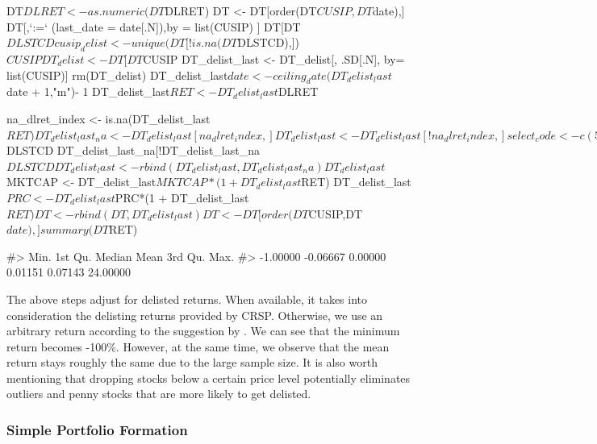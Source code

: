 \begin{Schunk}
\begin{Sinput}
DT$DLRET <- as.numeric(DT$DLRET)
DT <- DT[order(DT$CUSIP,DT$date),]
DT[,`:=` (last_date = date[.N]),by = list(CUSIP) ]
DT[DT$DLSTCD %
cusip_delist <- unique(DT[!is.na(DT$DLSTCD),])$CUSIP

DT_delist <- DT[DT$CUSIP %
DT_delist_last <- DT_delist[, .SD[.N],  by= list(CUSIP)]
rm(DT_delist)
DT_delist_last$date <- ceiling_date(DT_delist_last$date + 1,"m")- 1
DT_delist_last$RET <- DT_delist_last$DLRET

na_dlret_index <- is.na(DT_delist_last$RET)
DT_delist_last_na <- DT_delist_last[na_dlret_index,]
DT_delist_last <-DT_delist_last[!na_dlret_index,]

select_code <- c(500,520:551,573,574,580,584)
DT_delist_last_na[DT_delist_last_na$DLSTCD %
DT_delist_last_na[!DT_delist_last_na$DLSTCD %

DT_delist_last <- rbind(DT_delist_last,DT_delist_last_na)
DT_delist_last$MKTCAP <- DT_delist_last$MKTCAP*(1 + DT_delist_last$RET)
DT_delist_last$PRC <- DT_delist_last$PRC*(1 + DT_delist_last$RET)

DT <- rbind(DT,DT_delist_last)
DT <- DT[order(DT$CUSIP,DT$date),]
summary(DT$RET) %
\end{Sinput}
\begin{Soutput}
#>     Min.  1st Qu.   Median     Mean  3rd Qu.     Max. 
#> -1.00000 -0.06667  0.00000  0.01151  0.07143 24.00000
\end{Soutput}
\end{Schunk} 

The above steps adjust for delisted returns. When available, it takes into consideration the delisting returns provided by CRSP. Otherwise, we use an arbitrary return according to the
suggestion by \cite{bali2016empirical}. We can see that the minimum return becomes
-100\%. However, at the same time, we observe that the mean return stays
roughly the same due to the large sample size. It is also worth
mentioning that dropping stocks below a certain price level potentially
eliminates outliers and penny stocks that are more likely to get
delisted.

\hypertarget{simple-portfolio-formation}{%
\subsubsection{Simple Portfolio
Formation}\label{simple-portfolio-formation}}

